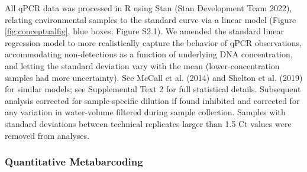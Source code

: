 \documentclass[
]{article}
\begin{document}
All qPCR data was processed in R using Stan (Stan Development Team
2022), relating environmental samples to the standard curve via a linear
model (Figure \ref{fig:conceptualfig}, blue boxes; Figure S2.1). We
amended the standard linear regression model to more realistically
capture the behavior of qPCR observations, accommodating non-detections
as a function of underlying DNA concentration, and letting the standard
deviation vary with the mean (lower-concentration samples had more
uncertainty). See McCall et al. (2014) and Shelton et al. (2019) for
similar models; see Supplemental Text 2 for full statistical details.
Subsequent analysis corrected for sample-specific dilution if found
inhibited and corrected for any variation in water-volume filtered
during sample collection. Samples with standard deviations between
technical replicates larger than 1.5 Ct values were removed from
analyses.

\hypertarget{quantitative-metabarcoding}{%
\subsubsection{Quantitative
Metabarcoding}\label{quantitative-metabarcoding}}
\end{document}
